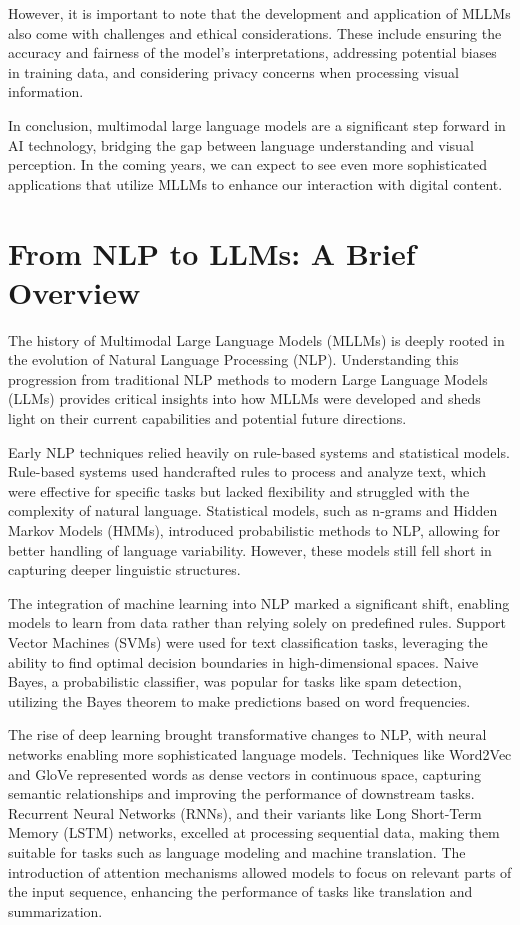 However, it is important to note that the development and application of MLLMs also come with challenges and ethical considerations. These include ensuring the accuracy and fairness of the model's interpretations, addressing potential biases in training data, and considering privacy concerns when processing visual information.

In conclusion, multimodal large language models are a significant step forward in AI technology, bridging the gap between language understanding and visual perception. In the coming years, we can expect to see even more sophisticated applications that utilize MLLMs to enhance our interaction with digital content.

\section{From NLP to LLMs: A Brief Overview}

The history of Multimodal Large Language Models (MLLMs) is deeply rooted in the evolution of Natural Language Processing (NLP). Understanding this progression from traditional NLP methods to modern Large Language Models (LLMs) provides critical insights into how MLLMs were developed and sheds light on their current capabilities and potential future directions.

Early NLP techniques relied heavily on rule-based systems and statistical models. Rule-based systems used handcrafted rules to process and analyze text, which were effective for specific tasks but lacked flexibility and struggled with the complexity of natural language. Statistical models, such as n-grams and Hidden Markov Models (HMMs), introduced probabilistic methods to NLP, allowing for better handling of language variability. However, these models still fell short in capturing deeper linguistic structures.

The integration of machine learning into NLP marked a significant shift, enabling models to learn from data rather than relying solely on predefined rules. Support Vector Machines (SVMs) were used for text classification tasks, leveraging the ability to find optimal decision boundaries in high-dimensional spaces. Naive Bayes, a probabilistic classifier, was popular for tasks like spam detection, utilizing the Bayes theorem to make predictions based on word frequencies.

The rise of deep learning brought transformative changes to NLP, with neural networks enabling more sophisticated language models. Techniques like Word2Vec and GloVe represented words as dense vectors in continuous space, capturing semantic relationships and improving the performance of downstream tasks. Recurrent Neural Networks (RNNs), and their variants like Long Short-Term Memory (LSTM) networks, excelled at processing sequential data, making them suitable for tasks such as language modeling and machine translation. The introduction of attention mechanisms allowed models to focus on relevant parts of the input sequence, enhancing the performance of tasks like translation and summarization.

